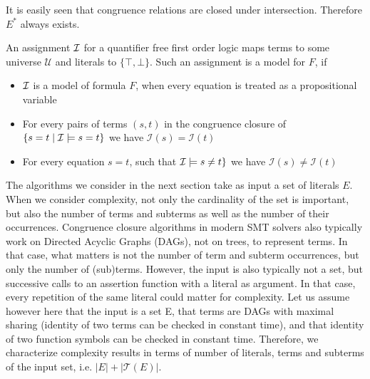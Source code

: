 \documentclass[smallextended]{svjour3}
\begin{document}
It is easily seen that congruence relations are closed under intersection.
Therefore $E^*$ always exists.

An assignment ${\cal I}$ for a quantifier free first order logic maps terms to some universe $\mathcal{U}$ and literals to $\{\top,\bot\}$.
Such an assignment is a model for $F$, if 
\begin{itemize}
\item ${\cal I}$ is a model of formula $F$, when every equation is treated as a propositional variable
\item For every pairs of terms $(s,t)$ in the congruence closure of $\{s=t\mid {\cal I} \models s = t\}$ we have $\mathcal{I}(s) = \mathcal{I}(t)$
\item For every equation $s = t$, such that ${\cal I} \models s \neq t\}$ we have $\mathcal{I}(s) \neq \mathcal{I}(t)$
\end{itemize}

%
%
%
%
%

The algorithms we consider in the next section take as input a set of literals $E$. %
When we consider complexity, not only the cardinality of the set is important, but also the number of terms and subterms as well as the number of their occurrences. 
Congruence closure algorithms in modern SMT solvers also typically work on Directed Acyclic Graphs (DAGs), not on trees, to represent terms. In that case, what matters is not the number of term and subterm occurrences, but only the number of (sub)terms. However, the input is also typically not a set, but successive calls to an assertion function with a literal as argument. In that case, every repetition of the
same literal could matter for complexity. 
Let us assume however here that the input is a set E, that terms are DAGs with maximal sharing (identity of two terms can be checked in constant time), and that identity of two function symbols can be checked in constant time. 
Therefore, we characterize complexity results in terms of number of literals, terms and subterms of the input set, i.e. $|E| + |\mathcal{T}(E)|$.
\end{document}
